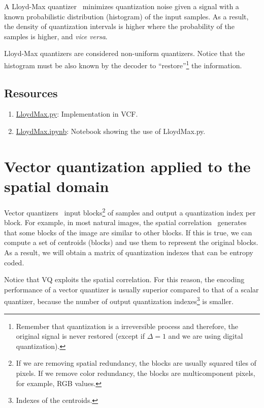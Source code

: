 A Lloyd-Max quantizer~\cite{vruiz__scalar_quantization} minimizes
quantization noise given a signal with a known probabilistic
distribution (histogram) of the input samples. As a result, the
density of quantization intervals is higher where the probability of
the samples is higher, and \textit{vice versa}.

Lloyd-Max quantizers are considered non-uniform quantizers. Notice
that the histogram must be also known by the decoder to
``restore''\footnote{Remember that quantization is a irreversible
  process and therefore, the original signal is never restored (except
  if $\Delta=1$ and we are using digital quantization).} the
information.

\subsection*{Resources}

\begin{enumerate}
\item
  \href{https://github.com/Sistemas-Multimedia/VCF/blob/main/src/LloydMax.py}{LloydMax.py}: Implementation in VCF.
\item \href{https://github.com/Sistemas-Multimedia/VCF/blob/main/notebooks/LloydMax.ipynb}{LloydMax.ipynb}:  Notebook showing the use of LloydMax.py.
\end{enumerate}

\section{Vector quantization applied to the spatial domain}

Vector quantizers~\cite{vruiz__vector_quantization} input
blocks\footnote{If we are removing spatial redundancy, the blocks are
  usually squared tiles of pixels. If we remove color redundancy, the
  blocks are multicomponent pixels, for example, RGB values.} of
samples and output a quantization index per block. For example, in
most natural images, the spatial
correlation~\cite{vruiz__visual_redundancy} generates that some blocks
of the image are similar to other blocks. If this is true, we can
compute a set of centroids (blocks) and use them to represent the
original blocks. As a result, we will obtain a matrix of quantization
indexes that can be entropy coded.

Notice that VQ exploits the spatial correlation. For this reason, the
encoding performance of a vector quantizer is usually superior
compared to that of a scalar quantizer, because the number of output
quantization indexes\footnote{Indexes of the centroids.} is smaller.

